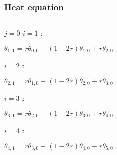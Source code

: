 \documentclass[aspectratio=169]{beamer}
\begin{document}
\begin{frame}
    \frametitle{Heat equation}
    \begin{columns}
        \begin{column}{.48\linewidth}
            \begin{block}{$j = 0$}
                $i = 1$ :\\
                \begin{center}
                    $\theta_{1, 1} = r \theta_{0, 0} + (1-2r)\theta_{1, 0} + r \theta_{2, 0}$\\
                \end{center}
                $i = 2$ : \\
                \begin{center}
                    $\theta_{2, 1} = r \theta_{1, 0} + (1-2r)\theta_{2, 0} + r \theta_{3, 0}$\\
                \end{center}
                $i = 3$ : \\
                \begin{center}
                    $\theta_{3, 1} = r \theta_{2, 0} + (1-2r)\theta_{3, 0} + r \theta_{4, 0}$\\
                \end{center}
                $i = 4$ : \\
                \begin{center}
                    $\theta_{4, 1} = r \theta_{3, 0} + (1-2r)\theta_{4, 0} + r \theta_{5, 0}$\\
                \end{center}

            \end{block}
        \end{column}

        \begin{column}{.48\linewidth}
\end{column}
\end{columns}
\end{frame}
\end{document}
